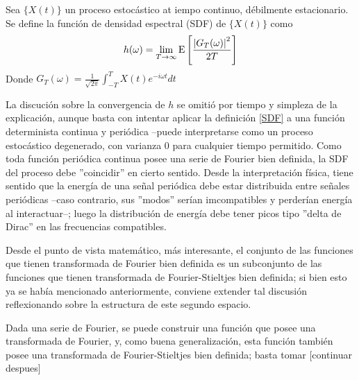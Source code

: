 \begin{defn}
Sea $\{X(t)\}$ un proceso estoc\'astico at iempo continuo, d\'ebilmente estacionario. Se define
la funci\'on de densidad espectral (SDF) de $\{X(t)\}$ como
\begin{equation*}
h(\omega) = \lim_{T\rightarrow \infty} \mathrm{E}\left[  \frac{ \left| G_T(\omega) \right|^{2}}{2 T}  \right]
\end{equation*}
Donde $G_T (\omega) = \frac{1}{\sqrt{2 \pi}} \int_{-T}^{T} X(t) e^{-i \omega t} dt$
\label{SDF}
\end{defn}



La discuci\'on sobre la convergencia de $h$ se omiti\'o por tiempo y simpleza de la explicaci\'on,
aunque basta con intentar aplicar la definici\'on \ref{SDF} a una funci\'on determinista
continua y peri\'odica --puede interpretarse como un proceso estoc\'astico degenerado, 
con varianza 0
para cualquier tiempo permitido. 
Como toda funci\'on peri\'odica continua posee una serie de Fourier bien definida, la SDF del
proceso debe ''coincidir'' en cierto sentido. 
Desde la interpretaci\'on f\'isica, tiene sentido que la energ\'ia de una se\~nal peri\'odica
debe estar distribuida entre se\~nales peri\'odicas --caso contrario, sus ''modos'' ser\'ian
imcompatibles y perder\'ian energ\'ia al interactuar--; luego la distribuci\'on de energ\'ia
debe tener picos tipo ''delta de Dirac'' en las frecuencias compatibles.

Desde el punto de vista matem\'atico, m\'as interesante,
el conjunto de las funciones que tienen transformada de 
Fourier bien definida es un subconjunto de las funciones que tienen transformada de
Fourier-Stieltjes bien definida; si bien esto ya se hab\'ia mencionado anteriormente, conviene
extender tal discusi\'on reflexionando sobre la estructura de este segundo espacio.

Dada una serie de Fourier, se puede construir una funci\'on que posee una transformada de
Fourier,
y, como buena generalizaci\'on, esta funci\'on tambi\'en posee una transformada de 
Fourier-Stieltjes bien definida; basta tomar [continuar despues]

